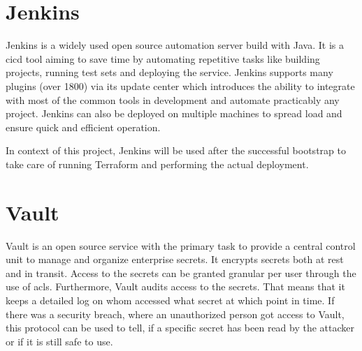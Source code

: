 \section{Jenkins}
Jenkins is a widely used open source automation server build with Java.
It is a \ac{cicd} tool aiming to save time by automating repetitive tasks like building projects, running test sets and deploying the service.
Jenkins supports many plugins (over 1800) via its update center which introduces the ability to integrate with most of the common tools in development and automate practicably any project.
Jenkins can also be deployed on multiple machines to spread load and ensure quick and efficient operation.
\cite{jenkins.io, jenkins.github, gitlab.cicd}

In context of this project, Jenkins will be used after the successful bootstrap to take care of running Terraform and performing the actual deployment.

    

\section{Vault}
\label{sec:vault}
Vault is an open source service with the primary task to provide a central control unit to manage and organize enterprise secrets.
It encrypts secrets both at rest and in transit.
Access to the secrets can be granted granular per user through the use of \acp{acl}.
Furthermore, Vault audits access to the secrets.
That means that it keeps a detailed log on whom accessed what secret at which point in time.
If there was a security breach, where an unauthorized person got access to Vault, this protocol can be used to tell, if a specific secret has been read by the attacker or if it is still safe to use.

